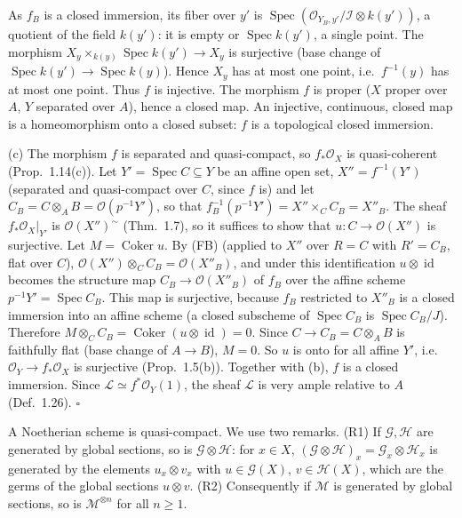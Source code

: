 \documentclass[11pt]{article}
\begin{document}
As $f_B$ is a closed immersion, its fiber over $y'$ is $\operatorname{Spec}(\mathcal{O}_{Y_B,y'}/\mathcal{I}\otimes k(y'))$, a quotient of the field $k(y')$: it is empty or $\operatorname{Spec}k(y')$, a single point. The morphism $X_y\times_{k(y)}\operatorname{Spec}k(y')\to X_y$ is surjective (base change of $\operatorname{Spec}k(y')\to\operatorname{Spec}k(y)$). Hence $X_y$ has at most one point, i.e.\ $f^{-1}(y)$ has at most one point. Thus $f$ is injective. The morphism $f$ is proper ($X$ proper over $A$, $Y$ separated over $A$), hence a closed map. An injective, continuous, closed map is a homeomorphism onto a closed subset: $f$ is a topological closed immersion.

(c) The morphism $f$ is separated and quasi-compact, so $f_*\mathcal{O}_X$ is quasi-coherent (Prop.~1.14(c)). Let $Y'=\operatorname{Spec}C\subseteq Y$ be an affine open set, $X''=f^{-1}(Y')$ (separated and quasi-compact over $C$, since $f$ is) and let $C_B=C\otimes_AB=\mathcal{O}(p^{-1}Y')$, so that $f_B^{-1}(p^{-1}Y')=X''\times_CC_B=X''_B$. The sheaf $f_*\mathcal{O}_X|_{Y'}$ is $\mathcal{O}(X'')^\sim$ (Thm.~1.7), so it suffices to show that $u:C\to\mathcal{O}(X'')$ is surjective. Let $M=\operatorname{Coker}u$. By (FB) (applied to $X''$ over $R=C$ with $R'=C_B$, flat over $C$), $\mathcal{O}(X'')\otimes_CC_B=\mathcal{O}(X''_B)$, and under this identification $u\otimes\operatorname{id}$ becomes the structure map $C_B\to\mathcal{O}(X''_B)$ of $f_B$ over the affine scheme $p^{-1}Y'=\operatorname{Spec}C_B$. This map is surjective, because $f_B$ restricted to $X''_B$ is a closed immersion into an affine scheme (a closed subscheme of $\operatorname{Spec}C_B$ is $\operatorname{Spec}C_B/J$). Therefore $M\otimes_CC_B=\operatorname{Coker}(u\otimes\operatorname{id})=0$. Since $C\to C_B=C\otimes_AB$ is faithfully flat (base change of $A\to B$), $M=0$. So $u$ is onto for all affine $Y'$, i.e.\ $\mathcal{O}_Y\to f_*\mathcal{O}_X$ is surjective (Prop.~1.5(b)). Together with (b), $f$ is a closed immersion. Since $\mathcal{L}\simeq f^*\mathcal{O}_Y(1)$, the sheaf $\mathcal{L}$ is very ample relative to $A$ (Def.~1.26). \hfill$\square$

\pf
A Noetherian scheme is quasi-compact. We use two remarks. (R1) If $\mathcal{G},\mathcal{H}$ are generated by global sections, so is $\mathcal{G}\otimes\mathcal{H}$: for $x\in X$, $(\mathcal{G}\otimes\mathcal{H})_x=\mathcal{G}_x\otimes\mathcal{H}_x$ is generated by the elements $u_x\otimes v_x$ with $u\in\mathcal{G}(X)$, $v\in\mathcal{H}(X)$, which are the germs of the global sections $u\otimes v$. (R2) Consequently if $\mathcal{M}$ is generated by global sections, so is $\mathcal{M}^{\otimes n}$ for all $n\ge1$.
\end{document}
